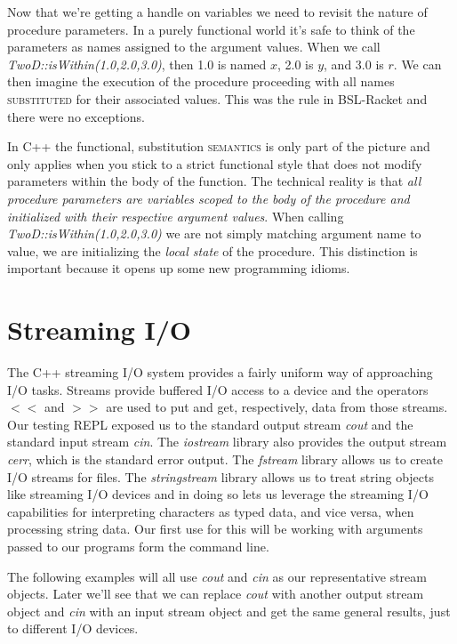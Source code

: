 \documentclass[]{tufte-handout}
\begin{document}
Now that we're getting a handle on variables we need to revisit the nature of procedure parameters. In a purely functional world it's safe to think of the parameters as names assigned to the argument values. When we call \textit{TwoD::isWithin(1.0,2.0,3.0)}, then 1.0 is named $x$, 2.0 is $y$, and $3.0$ is $r$. We can then imagine the execution of the procedure proceeding with all names \textsc{substituted} for their associated values. This was the rule in BSL-Racket and there were no exceptions. 

In C++ the functional, substitution \textsc{semantics} is only part of the picture and only applies when you stick to a strict functional style that does not modify parameters within the body of the function. The technical reality is that \textit{all procedure parameters are variables scoped to the body of the procedure and initialized with their respective argument values}. When calling \textit{TwoD::isWithin(1.0,2.0,3.0)} we are not simply matching argument name to value, we are initializing the \textit{local state} of the procedure.  This distinction is important because it opens up some new programming idioms. 


\section{Streaming I/O}

The C++ streaming I/O system provides a fairly uniform way of approaching I/O tasks. Streams provide buffered I/O access to a device and the operators $<<$ and $>>$ are used to put and get, respectively, data from those streams. Our testing REPL exposed us to the standard output stream \textit{cout} and the standard input stream \textit{cin}. The \textit{iostream} library also provides the output stream \textit{cerr}, which is the standard error output. The \textit{fstream} library allows us to create I/O streams for files. The \textit{stringstream} library allows us to treat string objects like streaming I/O devices and in doing so lets us leverage the streaming I/O capabilities for interpreting characters as typed data, and vice versa, when processing string data. Our first use for this will be working with arguments passed to our programs form the command line.

The following examples will all use \textit{cout} and \textit{cin} as our representative stream objects. Later we'll see that we can replace \textit{cout} with another output stream object and \textit{cin} with an input stream object and get the same general results, just to different I/O devices.
\end{document}
